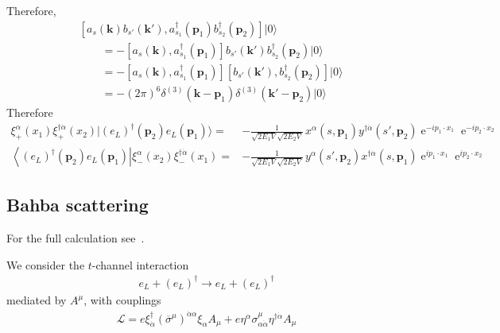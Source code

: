Therefore,
\begin{align}
&\left[ a_s(\mathbf{k})b_{s'}(\mathbf{k}'),a_{s_1}^\dagger(\mathbf{p}_1)b_{s_2}^\dagger(\mathbf{p}_2)\right] |0\rangle \nonumber\\
&\qquad=
-
 \left[ a_s(\mathbf{k}),a_{s_1}^\dagger(\mathbf{p}_1)\right]b_{s'}(\mathbf{k}')b_{s_2}^\dagger(\mathbf{p}_2) |0\rangle \nonumber\\
&\qquad=-
  \left[ a_s(\mathbf{k}),a_{s_1}^\dagger(\mathbf{p}_1)\right] \left[ b_{s'}(\mathbf{k}'),b_{s_2}^\dagger(\mathbf{p}_2)  \right] |0\rangle \nonumber\\
&\qquad= -(2\pi)^6  
    \delta^{(3)}(\mathbf{k}-\mathbf{p}_1)\delta^{(3)}(\mathbf{k}'-\mathbf{p}_2)|0\rangle
\end{align}
Therefore
\begin{align}
\label{eq:bkeldel}
    \xi^\alpha_{+}(x_1)\xi^{\dagger\dot{\alpha}}_{+}(x_2)|\left(e_L\right)^{\dagger}(\mathbf{p}_2)e_L(\mathbf{p}_1)\rangle=&
-\frac{1}{\sqrt{2E_1 V}\sqrt{2E_2 V}}\,x^\alpha(s,\mathbf{p}_1)y^{\dagger\dot{\alpha}}(s',\mathbf{p}_2)\operatorname{e}^{-i p_1\cdot x_1}\operatorname{e}^{-i p_2\cdot x_2} \nonumber\\
   \left\langle\left(e_L\right)^{\dagger}(\mathbf{p}_2) e_L(\mathbf{p}_1) \right|\xi^{\alpha}_-(x_2)\xi^{\dagger\dot{\alpha}}_-\left( x_1 \right)=&
-\frac{1}{\sqrt{2E_1 V}\sqrt{2E_2 V}}\,y^{\alpha}(s',\mathbf{p}_2) x^{\dagger\dot{\alpha}}(s,\mathbf{p}_1)\operatorname{e}^{i p_1\cdot x_1}\operatorname{e}^{i p_2\cdot x_2}
\end{align}

\subsection{Bahba scattering}


For the full calculation see~\cite{Kersch:1985rn}.

We consider the $t$-channel interaction
\begin{align}
  e_L+\left( e_L \right)^{\dagger} \to   e_L+\left( e_L \right)^{\dagger}
\end{align}
mediated by $A^{\mu}$, with couplings
\begin{align}
\label{eq:xietaz}
\mathcal{L}=e \xi^{\dagger}_{\dot{\alpha}}\left( \overline{\sigma}^{\mu} \right)^{\dot{\alpha}\alpha}\xi_{\alpha} A_{\mu}
+e \eta^{\alpha} \sigma^{\mu}_{\alpha\dot{\alpha}} \eta^{\dagger\dot{\alpha}} A_{\mu}
\end{align}


